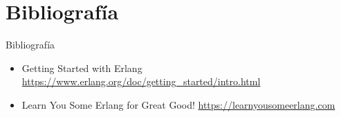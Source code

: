 \documentclass{beamer}
\begin{document}
  \section{Bibliografía}
    \begin{frame}{Bibliografía}
      \begin{itemize}
        \item Getting Started with Erlang \url{https://www.erlang.org/doc/getting_started/intro.html}
        \item Learn You Some Erlang for Great Good! \url{https://learnyousomeerlang.com}
      \end{itemize}
    \end{frame}
\end{document}
